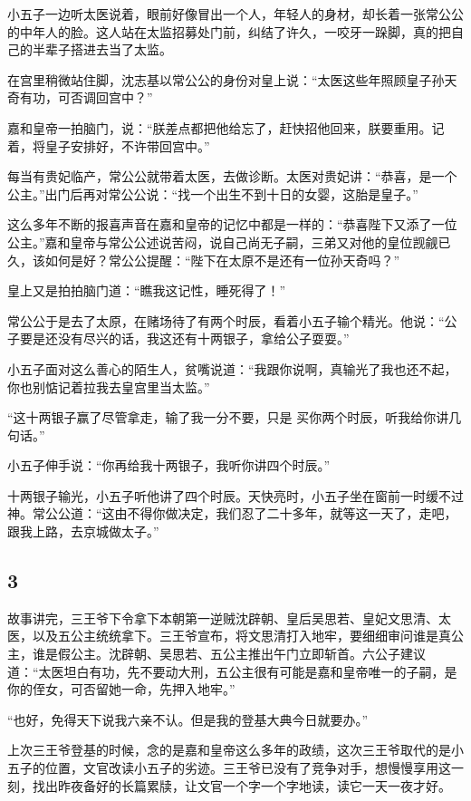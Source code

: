 小五子一边听太医说着，眼前好像冒出一个人，年轻人的身材，却长着一张常公公的中年人的脸。这人站在太监招募处门前，纠结了许久，一咬牙一跺脚，真的把自己的半辈子搭进去当了太监。

在宫里稍微站住脚，沈志基以常公公的身份对皇上说：“太医这些年照顾皇子孙天奇有功，可否调回宫中？”

嘉和皇帝一拍脑门，说：“朕差点都把他给忘了，赶快招他回来，朕要重用。记着，将皇子安排好，不许带回宫中。”

每当有贵妃临产，常公公就带着太医，去做诊断。太医对贵妃讲：“恭喜，是一个公主。”出门后再对常公公说：“找一个出生不到十日的女婴，这胎是皇子。”

这么多年不断的报喜声音在嘉和皇帝的记忆中都是一样的：“恭喜陛下又添了一位公主。”嘉和皇帝与常公公述说苦闷，说自己尚无子嗣，三弟又对他的皇位觊觎已久，该如何是好？常公公提醒：“陛下在太原不是还有一位孙天奇吗？”

皇上又是拍拍脑门道：“瞧我这记性，睡死得了！”

常公公于是去了太原，在赌场待了有两个时辰，看着小五子输个精光。他说：“公子要是还没有尽兴的话，我这还有十两银子，拿给公子耍耍。”

小五子面对这么善心的陌生人，贫嘴说道：“我跟你说啊，真输光了我也还不起，你也别惦记着拉我去皇宫里当太监。”

“这十两银子赢了尽管拿走，输了我一分不要，只是
买你两个时辰，听我给你讲几句话。”

小五子伸手说：“你再给我十两银子，我听你讲四个时辰。”

十两银子输光，小五子听他讲了四个时辰。天快亮时，小五子坐在窗前一时缓不过神。常公公道：“这由不得你做决定，我们忍了二十多年，就等这一天了，走吧，跟我上路，去京城做太子。”
\newline

{\centering\subsection{3}}

故事讲完，三王爷下令拿下本朝第一逆贼沈辟朝、皇后吴思若、皇妃文思清、太医，以及五公主统统拿下。三王爷宣布，将文思清打入地牢，要细细审问谁是真公主，谁是假公主。沈辟朝、吴思若、五公主推出午门立即斩首。六公子建议道：“太医坦白有功，先不要动大刑，五公主很有可能是嘉和皇帝唯一的子嗣，是你的侄女，可否留她一命，先押入地牢。”

“也好，免得天下说我六亲不认。但是我的登基大典今日就要办。”

上次三王爷登基的时候，念的是嘉和皇帝这么多年的政绩，这次三王爷取代的是小五子的位置，文官改读小五子的劣迹。三王爷已没有了竞争对手，想慢慢享用这一刻，找出昨夜备好的长篇累牍，让文官一个字一个字地读，读它一天一夜才好。

